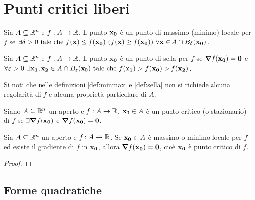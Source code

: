\section{Punti critici liberi}

\begin{definition}
    \label{def:minmax}
    Sia $A \subseteq \mathbb{R}^n$ e $f: A \to \mathbb{R}$. Il punto $\vb{x_0}$ è un punto di massimo (minimo) locale per $f$ se $\exists \delta > 0 \text{ tale che } f(\vb{x}) \leq f(\vb{x_0})\ (f(\vb{x})\geq f(\vb{x_0})) \ \forall \vb{x} \in A \cap B_\delta (\vb{x_0})$.
\end{definition}

\begin{definition}
    \label{def:sella}
    Sia $A \subseteq \mathbb{R}^n$ e $f: A \to \mathbb{R}$. Il punto $\vb{x_0}$ è un punto di sella per $f$ se $\grad f(\vb{x_0})=\vb{0}$ e $\forall \varepsilon > 0 \ \exists \vb{x_1}, \vb{x_2} \in A \cap B_\varepsilon(\vb{x_0}) \text{ tale che } f(\vb{x_1}) > f(\vb{x_0}) > f(\vb{x_2})$.
\end{definition}

\begin{remark}
    Si noti che nelle definizioni \ref{def:minmax} e \ref{def:sella} non si richiede alcuna regolarità di $f$ e alcuna proprietà particolare di $A$.
\end{remark}

\begin{definition}
    Siano $A \subseteq \mathbb{R}^n$ un aperto e $f: A\to \mathbb{R}$. $\vb{x_0} \in A$ è un punto critico (o stazionario) di $f$ se $\exists \grad f(\vb{x_0})$ e $\grad f(\vb{x_0})=\vb{0}$.
\end{definition}

\begin{theorem}
    [di Fermat]
    Sia $A \subseteq \mathbb{R}^n$ un aperto e $f: A \to \mathbb{R}$. Se $\vb{x_0} \in A$ è massimo o minimo locale per $f$ ed esiste il gradiente di $f$ in $\vb{x_0}$, allora $\grad f(\vb{x_0})=\vb{0}$, cioè $\vb{x_0}$ è punto critico di $f$.
\end{theorem}

\begin{proof}
\end{proof}

\subsection{Forme quadratiche}


